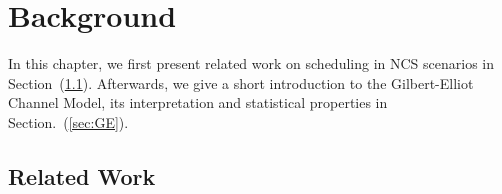 \chapter{Background}


In this chapter, we first present related work on scheduling in NCS scenarios in
Section~(\ref{sec:survey}). Afterwards, we give a short introduction to the
Gilbert-Elliot Channel Model, its interpretation and statistical properties in
Section.~(\ref{sec:GE}). 

\section{Related Work} \label{sec:survey}

